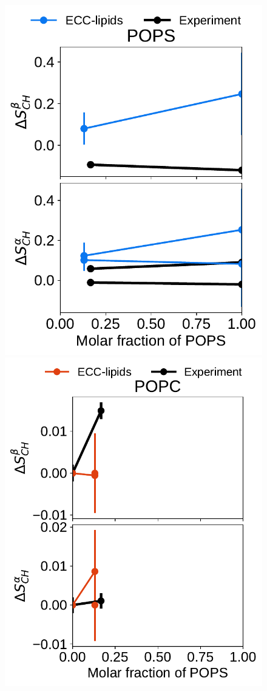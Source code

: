 \begin{figure}[htb!]
  \includegraphics[width=\figwidth]{../img/ecc_pops/l17/order_parameters_changes_A-B_PC-PS_mix_POPS_nacl.pdf} 
  \includegraphics[width=\figwidth]{../img/ecc_pops/order_parameters_changes_A-B_PC-PS_mix_POPC_nacl.pdf} 

\end{figure}
